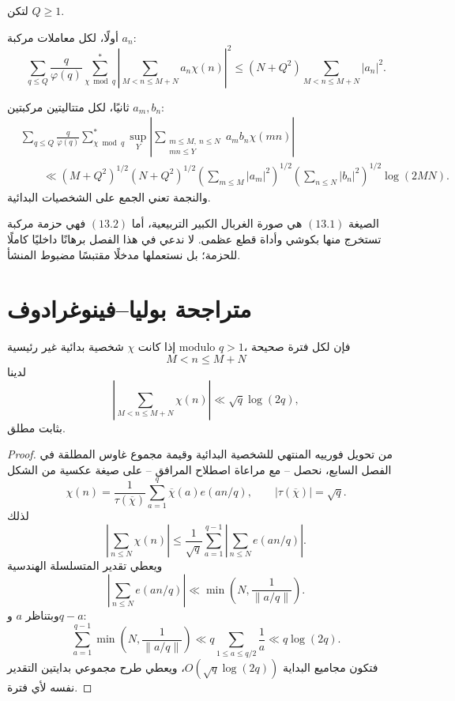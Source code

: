 \begin{theorem}
\label{thm:chapter13-large-sieve-package}
لتكن \(Q\ge1\).

أولًا، لكل معاملات مركبة \(a_n\):
\[
\sum_{q\le Q}\frac{q}{\varphi(q)}
\sum_{\chi\bmod q}^{*}
\left|
\sum_{M<n\le M+N}a_n\chi(n)
\right|^2
\le
(N+Q^2)
\sum_{M<n\le M+N}|a_n|^2.
\tag{13.1}
\]

ثانيًا، لكل متتاليتين مركبتين \(a_m,b_n\):
\begin{align*}
&\sum_{q\le Q}\frac{q}{\varphi(q)}
\sum_{\chi\bmod q}^{*}
\sup_Y
\left|
\sum_{\substack{m\le M,\ n\le N\\mn\le Y}}
 a_mb_n\chi(mn)
\right|\\
&\qquad\ll
(M+Q^2)^{1/2}(N+Q^2)^{1/2}
\left(\sum_{m\le M}|a_m|^2\right)^{1/2}
\left(\sum_{n\le N}|b_n|^2\right)^{1/2}
\log(2MN).
\tag{13.2}
\end{align*}
والنجمة تعني الجمع على الشخصيات البدائية.
\end{theorem}

الصيغة \((13.1)\) هي صورة الغربال الكبير التربيعية، أما \((13.2)\) فهي
حزمة مركبة تستخرج منها بكوشي وأداة قطع عظمى. لا ندعي في هذا الفصل برهانًا
داخليًا كاملًا للحزمة؛ بل نستعملها مدخلًا مقتبسًا مضبوط المنشأ.

\section{متراجحة بوليا--فينوغرادوف}

\begin{lemma}
\label{lem:chapter13-polya-vinogradov}
\provedhere
إذا كانت \(\chi\) شخصية بدائية غير رئيسية modulo \(q>1\)، فإن لكل فترة
صحيحة
\[
M<n\le M+N
\]
لدينا
\[
\left|\sum_{M<n\le M+N}\chi(n)\right|
\ll \sqrt q\log(2q),
\tag{13.3}
\]
بثابت مطلق.
\end{lemma}

\begin{proof}
من تحويل فورييه المنتهي للشخصية البدائية وقيمة مجموع غاوس المطلقة في الفصل
السابع، نحصل -- مع مراعاة اصطلاح المرافق -- على صيغة عكسية من الشكل
\[
\chi(n)
=
\frac1{\tau(\overline\chi)}
\sum_{a=1}^{q}\overline\chi(a)e(an/q),
\qquad
|\tau(\overline\chi)|=\sqrt q.
\]
لذلك
\[
\left|\sum_{n\le N}\chi(n)\right|
\le
\frac1{\sqrt q}
\sum_{a=1}^{q-1}
\left|\sum_{n\le N}e(an/q)\right|.
\]
ويعطي تقدير المتسلسلة الهندسية
\[
\left|\sum_{n\le N}e(an/q)\right|
\ll
\min\left(N,\frac1{\|a/q\|}\right).
\]
وبتناظر \(a\) و\(q-a\):
\[
\sum_{a=1}^{q-1}
\min\left(N,\frac1{\|a/q\|}\right)
\ll
q\sum_{1\le a\le q/2}\frac1a
\ll q\log(2q).
\]
فتكون مجاميع البداية \(O(\sqrt q\log(2q))\)، ويعطي طرح مجموعي بدايتين
التقدير نفسه لأي فترة.
\end{proof}

